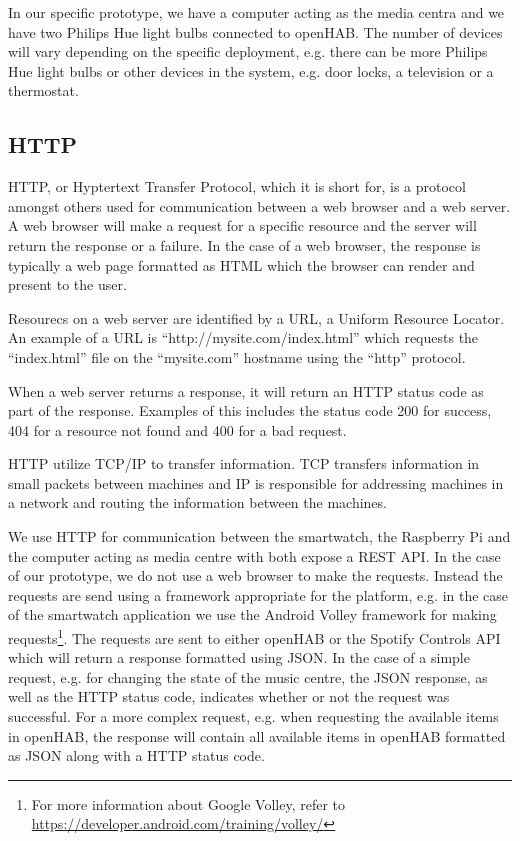 In our specific prototype, we have a computer acting as the media centra and we have two Philips Hue light bulbs connected to openHAB. The number of devices will vary depending on the specific deployment, e.g. there can be more Philips Hue light bulbs or other devices in the system, e.g. door locks, a television or a thermostat.

\subsection{HTTP}

HTTP, or Hyptertext Transfer Protocol, which it is short for, is a protocol amongst others used for communication between a web browser and a web server. A web browser will make a request for a specific resource and the server will return the response or a failure. In the case of a web browser, the response is typically a web page formatted as HTML which the browser can render and present to the user.

Resourecs on a web server are identified by a URL, a Uniform Resource Locator. An example of a URL is ``http://mysite.com/index.html'' which requests the ``index.html'' file on the ``mysite.com'' hostname using the ``http'' protocol.

When a web server returns a response, it will return an HTTP status code as part of the response. Examples of this includes the status code 200 for success, 404 for a resource not found and 400 for a bad request.

HTTP utilize TCP/IP to transfer information. TCP transfers information in small packets between machines and IP is responsible for addressing machines in a network and routing the information between the machines.

We use HTTP for communication between the smartwatch, the Raspberry Pi and the computer acting as media centre with both expose a REST API. In the case of our prototype, we do not use a web browser to make the requests. Instead the requests are send using a framework appropriate for the platform, e.g. in the case of the smartwatch application we use the Android Volley framework for making requests\footnote{For more information about Google Volley, refer to \url{https://developer.android.com/training/volley/}}.
The requests are sent to either openHAB or the Spotify Controls API which will return a response formatted using JSON. In the case of a simple request, e.g. for changing the state of the music centre, the JSON response, as well as the HTTP status code, indicates whether or not the request was successful. For a more complex request, e.g. when requesting the available items in openHAB, the response will contain all available items in openHAB formatted as JSON along with a HTTP status code.

